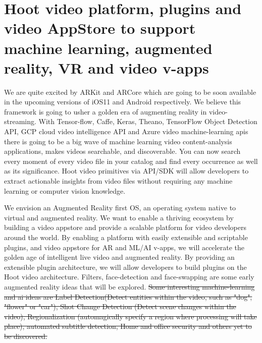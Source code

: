 \documentclass{article}
\begin{document}



\iffalse
\section{Hoot video platform, plugins and video AppStore to support machine learning,
 augmented reality, VR and video v-apps}
We are quite excited by ARKit and ARCore which are going to be soon available in the upcoming versions of iOS11 and Android respectively. We believe this framework is going to usher a golden era of augmenting reality in video-streaming. With Tensor-flow, Caffe, Keras, Theano, TensorFlow Object Detection API, GCP cloud video intelligence API and Azure video machine-learning apis there is going to be a big wave of machine learning video content-analysis applications, makes videos searchable, and discoverable. You can now search every moment of every video file in your catalog and find every occurrence as well as its significance. Hoot video primitives via API/SDK will allow developers to extract actionable insights from video files without requiring any machine learning or computer vision knowledge. 

We envision an Augmented Reality first OS, an operating system native to virtual and augmented reality. We want to enable a thriving ecosystem by building a video appstore and provide a scalable platform for video developers around the world. By enabling a platform with easily extensible and scriptable plugins, and video appstore for AR and ML/AI v-apps, we will accelerate the golden age of intelligent live video and augmented reality. By providing an extensible plugin architecture, we will allow developers to build plugins on the Hoot video architecture. Filters, face-detection and face-swapping are some early augmented reality ideas that will be explored. 
\sout{Some interesting machine-learning and ai ideas are Label Detection(Detect entities within the video, such as "dog", "flower" or "car"), Shot Change Detection (Detect scene changes within the video), Regionalization (automagically specify a region where processing will take place), automated subtitle detection, Home and office security and others yet to be discovered.} 
\end{document}
